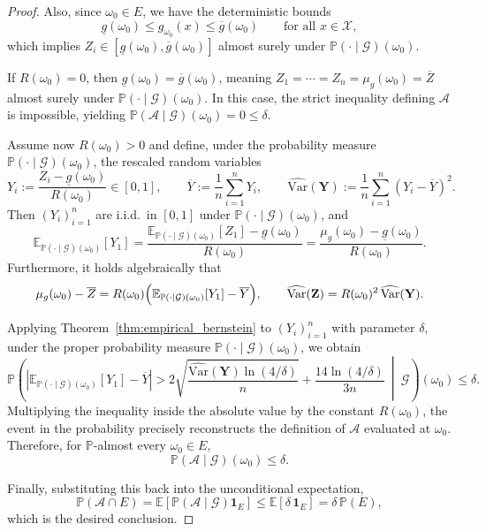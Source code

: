 \documentclass[twoside]{article}
\begin{document}
\begin{proof}
Also, since $\omega_0\in E$, we have the deterministic bounds
\[
\underline{g}(\omega_0)\le g_{\omega_0}(x)\le \overline{g}(\omega_0)\qquad\text{for all }x \in \mathcal{X},
\]
which implies $Z_i\in[\underline{g}(\omega_0),\overline{g}(\omega_0)]$ almost surely under $\mathbb{P}(\cdot\mid\mathcal{G})(\omega_0)$.

If $R(\omega_0)=0$, then $\underline{g}(\omega_0) = \overline{g}(\omega_0)$, meaning $Z_1=\cdots=Z_n=\mu_g(\omega_0)=\overline{Z}$ almost surely under $\mathbb{P}(\cdot\mid\mathcal{G})(\omega_0)$. In this case, the strict inequality defining $\mathcal A$ is impossible, yielding $\mathbb{P}(\mathcal A\mid\mathcal{G})(\omega_0) = 0 \le \delta$.

Assume now $R(\omega_0)>0$ and define, under the probability measure $\mathbb{P}(\cdot\mid\mathcal{G})(\omega_0)$, the rescaled random variables
\[
Y_i:=\frac{Z_i-\underline{g}(\omega_0)}{R(\omega_0)}\in[0,1],
\qquad
\overline Y:=\frac{1}{n}\sum_{i=1}^n Y_i,
\qquad
\widehat{\mathrm{Var}}(\mathbf Y):=\frac{1}{n}\sum_{i=1}^n (Y_i-\overline Y)^2.
\]
Then $(Y_i)_{i=1}^n$ are i.i.d.\ in $[0,1]$ under $\mathbb{P}(\cdot\mid\mathcal{G})(\omega_0)$, and
\[
\mathbb E_{\mathbb{P}(\cdot\mid\mathcal{G})(\omega_0)}[Y_1]
=
\frac{\mathbb E_{\mathbb{P}(\cdot\mid\mathcal{G})(\omega_0)}[Z_1]-\underline{g}(\omega_0)}{R(\omega_0)}
=
\frac{\mu_g(\omega_0)-\underline{g}(\omega_0)}{R(\omega_0)}.
\]
Furthermore, it holds algebraically that
\[
\mu_g(\omega_0)-\overline{Z}
=
R(\omega_0)\Bigl(\mathbb E_{\mathbb{P}(\cdot\mid\mathcal{G})(\omega_0)}[Y_1]-\overline Y\Bigr),
\qquad
\widehat{\mathrm{Var}}(\mathbf Z)
=
R(\omega_0)^2\,\widehat{\mathrm{Var}}(\mathbf Y).
\]

Applying Theorem~\ref{thm:empirical_bernstein} to $(Y_i)_{i=1}^n$ with parameter $\delta$, under the proper probability measure $\mathbb{P}(\cdot\mid\mathcal{G})(\omega_0)$, we obtain
\[
\mathbb{P}\left(
\left|
\mathbb E_{\mathbb{P}(\cdot\mid\mathcal{G})(\omega_0)}[Y_1]-\overline Y
\right|
>
2\sqrt{\frac{\widehat{\mathrm{Var}}(\mathbf Y)\ln(4/\delta)}{n}}
+
\frac{14\ln(4/\delta)}{3n}
\ \middle|\ \mathcal{G}
\right)(\omega_0)
\le
\delta.
\]
Multiplying the inequality inside the absolute value by the constant $R(\omega_0)$, the event in the probability precisely reconstructs the definition of $\mathcal A$ evaluated at $\omega_0$.
Therefore, for $\mathbb{P}$-almost every $\omega_0\in E$,
\[
\mathbb{P}(\mathcal A\mid\mathcal{G})(\omega_0)\le \delta.
\]

Finally, substituting this back into the unconditional expectation,
\[
\mathbb{P}(\mathcal A\cap E)
=
\mathbb E\left[\mathbb{P}(\mathcal A\mid\mathcal{G})\mathbf 1_E\right]
\le
\mathbb E[\delta\,\mathbf 1_E]
=
\delta\,\mathbb{P}(E),
\]
which is the desired conclusion.
\end{proof}
\end{document}
